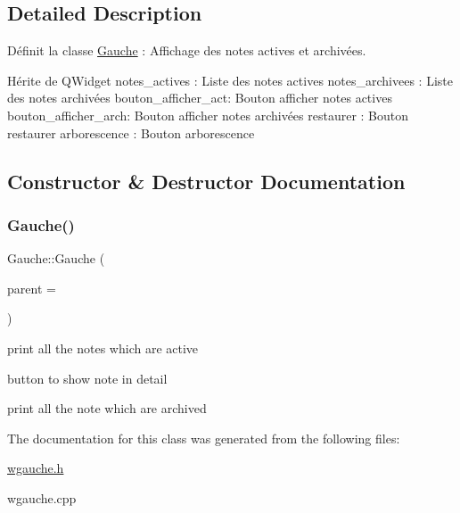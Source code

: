 \subsection{Detailed Description}
Définit la classe \hyperlink{class_gauche}{Gauche} \+: Affichage des notes actives et archivées. 

Hérite de Q\+Widget notes\+\_\+actives \+: Liste des notes actives notes\+\_\+archivees \+: Liste des notes archivées bouton\+\_\+afficher\+\_\+act\+: Bouton afficher notes actives bouton\+\_\+afficher\+\_\+arch\+: Bouton afficher notes archivées restaurer \+: Bouton restaurer arborescence \+: Bouton arborescence 

\subsection{Constructor \& Destructor Documentation}
\mbox{\label{class_gauche_a484580ec6e2985ffea805729dcea558e}} 
\subsubsection{\texorpdfstring{Gauche()}{Gauche()}}
{\footnotesize\ttfamily Gauche\+::\+Gauche (\begin{DoxyParamCaption}\item[{Q\+Main\+Window $\ast$}]{parent = {} }\end{DoxyParamCaption})\hspace{0.3cm}{\ttfamily [explicit]}}

print all the notes which are active

button to show note in detail

print all the note which are archived 

The documentation for this class was generated from the following files\+:\begin{DoxyCompactItemize}
\item 
\hyperlink{wgauche_8h}{wgauche.\+h}\item 
wgauche.\+cpp\end{DoxyCompactItemize}
